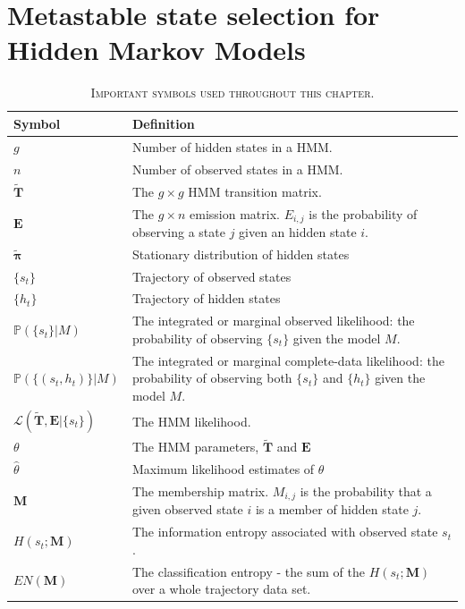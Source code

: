 \let\textcircled=\pgftextcircled
\chapter{Metastable state selection for Hidden Markov Models}
\label{chap:hmm}


\begin{table}
    \centering
    \caption[Important symbols]{\textsc{Important symbols used throughout this chapter}.}
    \begin{tabularx}{0.9\textwidth}{ l >{\raggedright\arraybackslash}X } 
    \hline
    \textbf{Symbol}  &  \textbf{Definition} \\
    \hline\hline
    $g$ & Number of hidden states in a HMM. \\
    $n$ & Number of observed states in a HMM. \\
    $\mathbf{\tilde{T}}$ & The $g\times g$ HMM transition matrix. \\
    $\mathbf{E}$ & The $g \times n$ emission matrix. $E_{i,j}$ is the probability of observing a state $j$ given an hidden state $i$. \\
    $\tilde{\bm{\pi}}$ & Stationary distribution of hidden states \\
    $\{s_{t}\}$ & Trajectory of observed states \\
    $\{h_{t}\}$ & Trajectory of hidden states \\
    $\mathbb{P}(\{s_t\}|M)$ & The integrated or marginal observed likelihood: the probability of observing $\{s_t\}$ given the model $M$. \\
    $\mathbb{P}(\{(s_t, h_t)\}|M)$ & The integrated or marginal complete-data likelihood: the probability of observing both $\{s_t\}$ and $\{h_t\}$ given the model $M$.  \\
    $\mathcal{L}(\tilde{\mathbf{T}}, \mathbf{E}| \{s_t\})$ & The HMM likelihood. \\
    $\theta$ & The HMM parameters, $\tilde{\mathbf{T}}$ and $\mathbf{E}$\\
    $\hat{\theta}$ & Maximum likelihood estimates of $\theta$ \\
    $\mathbf{M}$ & The membership matrix. $M_{i,j}$ is the probability that a given observed state $i$ is a member of hidden state $j$. \\
    $H(s_{t}; \mathbf{M})$ & The information entropy associated with observed state $s_{t}$. \\
    $EN(\mathbf{M})$ & The classification entropy - the sum of the $H(s_{t}; \mathbf{M})$ over a whole trajectory data set. \\
    \hline
    \end{tabularx}
    \label{tab:hmm_symbols}
\end{table}

